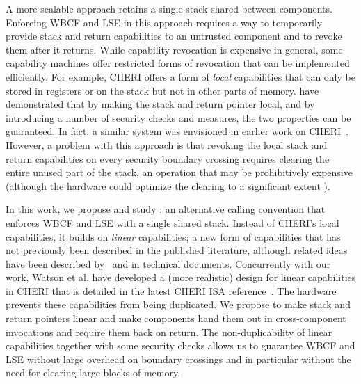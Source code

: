 \documentclass{jfp}
\begin{document}
A more scalable approach retains a single stack shared between components.
Enforcing WBCF and LSE in this approach requires a way to temporarily provide stack and return capabilities to an untrusted component and to revoke them after it returns.
While capability revocation is expensive in general, some capability machines offer restricted forms of revocation that can be implemented efficiently.
For example, CHERI offers a form of {\itshape local} capabilities that can only be stored in registers or on the stack but not in other parts of memory.
\citet{skorstengaard_reasoning_2017} have demonstrated that by making the stack and return pointer local, and by introducing a number of security checks and measures, the two properties can be guaranteed.
In fact, a similar system was envisioned in earlier work on CHERI~\citep{watson2012cheri}. 
However, a problem with this approach is that revoking the local stack and return capabilities on every security boundary crossing requires clearing the entire unused part of the stack, an operation that may be prohibitively expensive (although the hardware could optimize the clearing to a significant extent \citep{joannou_efficient_2017}).

In this work, we propose and study \stktokens{}: an alternative calling convention that enforces WBCF and LSE with a single shared stack.
Instead of CHERI's local capabilities, it builds on {\itshape linear} capabilities; a new form of capabilities that has not previously been described in the published literature, although related ideas have been described by~\citet[``scarce objects'']{szabo_formalizing_1997,szabo_scarce_objects} and in technical documents.
Concurrently with our work, Watson et al. have developed a (more realistic) design for linear capabilities in CHERI that is detailed in the latest CHERI ISA reference~\citep{watson2018ISA}.
The hardware prevents these capabilities from being duplicated.
We propose to make stack and return pointers linear and make components hand them out in cross-component invocations and require them back on return.
The non-duplicability of linear capabilities together with some security checks allows us to guarantee WBCF and LSE without large overhead on boundary crossings and in particular without the need for clearing large blocks of memory.
\end{document}
